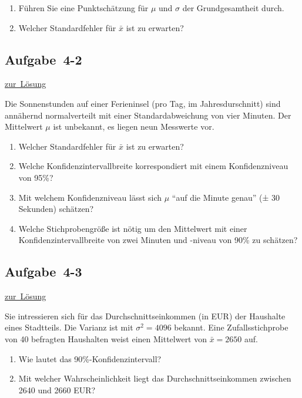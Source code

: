 \documentclass[
  11pt,
  ngerman,
  a4paper,
]{report}
\providecommand{\tightlist}{%
  \setlength{\itemsep}{0pt}\setlength{\parskip}{0pt}}
\begin{document}
\begin{enumerate}
\def\labelenumi{\alph{enumi})}
\tightlist
\item
  Führen Sie eine Punktschätzung für \(\mu\) und \(\sigma\) der Grundgesamtheit durch.
\item
  Welcher Standardfehler für \(\bar{x}\) ist zu erwarten?
\end{enumerate}

\hypertarget{aufgabe-4-2}{%
\subsection{Aufgabe~4-2}\label{aufgabe-4-2}}

\protect\hyperlink{loesung-4-2}{zur~Lösung}

Die Sonnenstunden auf einer Ferieninsel (pro Tag, im Jahresdurschnitt) sind annähernd normalverteilt mit einer Standardabweichung von vier Minuten. Der Mittelwert \(\mu\) ist unbekannt, es liegen neun Messwerte vor.

\begin{enumerate}
\def\labelenumi{\alph{enumi})}
\tightlist
\item
  Welcher Standardfehler für \(\bar{x}\) ist zu erwarten?
\item
  Welche Konfidenzintervallbreite korrespondiert mit einem Konfidenzniveau von 95\%?
\item
  Mit welchem Konfidenzniveau lässt sich \(\mu\) \enquote{auf die Minute genau} (± 30 Sekunden) schätzen?
\item
  Welche Stichprobengröße ist nötig um den Mittelwert mit einer Konfidenzintervallbreite von zwei Minuten und -niveau von 90\% zu schätzen?
\end{enumerate}

\hypertarget{aufgabe-4-3}{%
\subsection{Aufgabe~4-3}\label{aufgabe-4-3}}

\protect\hyperlink{loesung-4-3}{zur~Lösung}

Sie intressieren sich für das Durchschnittseinkommen (in EUR) der Haushalte eines Stadtteils. Die Varianz ist mit \(\sigma^2=4096\) bekannt. Eine Zufallsstichprobe von 40 befragten Haushalten weist einen Mittelwert von \(\bar{x}=2650\) auf.

\begin{enumerate}
\def\labelenumi{\alph{enumi})}
\tightlist
\item
  Wie lautet das 90\%-Konfidenzintervall?
\item
  Mit welcher Wahrscheinlichkeit liegt das Durchschnittseinkommen zwischen 2640 und 2660 EUR?
\end{enumerate}
\end{document}
